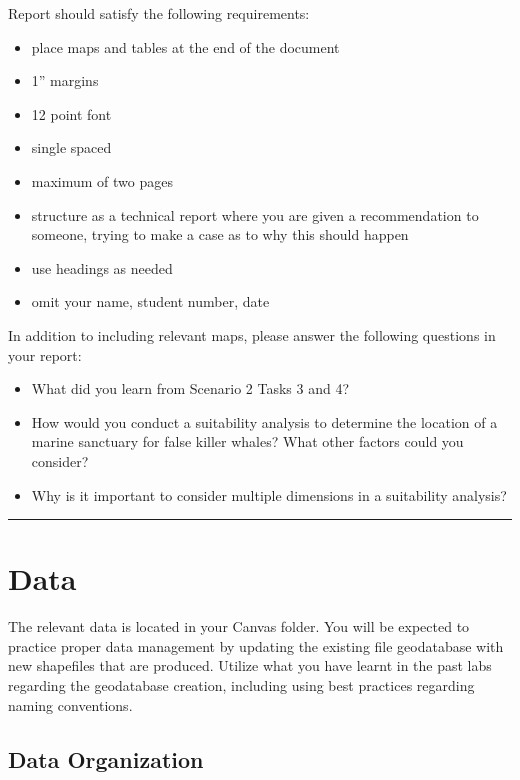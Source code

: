 \documentclass[
]{book}
\providecommand{\tightlist}{%
  \setlength{\itemsep}{0pt}\setlength{\parskip}{0pt}}
\begin{document}
Report should satisfy the following requirements:

\begin{itemize}
\tightlist
\item
  place maps and tables at the end of the document
\item
  1'' margins
\item
  12 point font
\item
  single spaced
\item
  maximum of two pages
\item
  structure as a technical report where you are given a recommendation to someone, trying to make a case as to why this should happen
\item
  use headings as needed
\item
  omit your name, student number, date
\end{itemize}

In addition to including relevant maps, please answer the following questions in your report:

\begin{itemize}
\tightlist
\item
  What did you learn from Scenario 2 Tasks 3 and 4?
\item
  How would you conduct a suitability analysis to determine the location of a marine sanctuary for false killer whales? What other factors could you consider?
\item
  Why is it important to consider multiple dimensions in a suitability analysis?
\end{itemize}

\begin{center}\rule{0.5\linewidth}{0.5pt}\end{center}

\hypertarget{data-3}{%
\section*{Data}\label{data-3}}

The relevant data is located in your Canvas folder. You will be expected to practice proper data management by updating the existing file geodatabase with new shapefiles that are produced. Utilize what you have learnt in the past labs regarding the geodatabase creation, including using best practices regarding naming conventions.

\hypertarget{data-organization}{%
\subsection*{Data Organization}\label{data-organization}}
\end{document}
